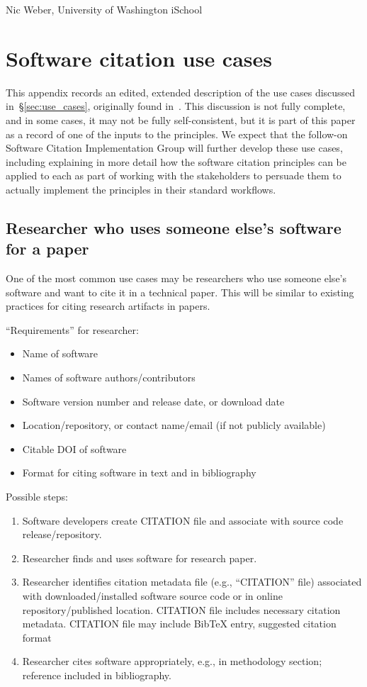 \documentclass[12pt, oneside]{amsart}
\begin{document}
Nic Weber, University of Washington iSchool

\section{Software citation use cases}
\label{app:usecases}

This appendix records an edited, extended description of the use cases
discussed in~\S\ref{sec:use_cases}, originally found in~\cite{SC-Use-Cases}.
This discussion is not fully complete, and in some cases, it may not be fully
self-consistent, but it is part of this paper as a record of one of the inputs
to the principles. We expect that the follow-on Software Citation
Implementation Group will further develop these use cases, including explaining
in more detail how the software citation principles can be applied
to each as part of working with the stakeholders to persuade them to actually
implement the principles in their standard workflows.


\subsection{Researcher who uses someone else's software for a paper}

One of the most common use cases may be researchers who use someone else's software and want to cite it in a technical paper.
This will be similar to existing practices for citing research artifacts in papers.

``Requirements'' for researcher:
\begin{itemize}
\item Name of software
\item Names of software authors/contributors
\item Software version number and release date, or download date
\item Location/repository, or contact name/email (if not publicly available)
\item Citable DOI of software
\item Format for citing software in text and in bibliography
\end{itemize}

Possible steps:
\begin{enumerate} \setcounter{enumi}{0}
\item Software developers create CITATION file and associate with source code release/repository.
\item Researcher finds and uses software for research paper.
\item Researcher identifies citation metadata file (e.g., ``CITATION'' file) associated with downloaded/installed software source code or in online repository/published location. CITATION file includes necessary citation metadata. CITATION file may include BibTeX entry, suggested citation format
\item Researcher cites software appropriately, e.g., in methodology section; reference included in bibliography.
\end{enumerate}
\end{document}
